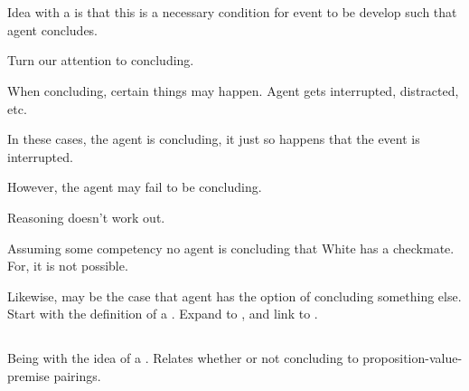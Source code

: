\chapter{}
\label{cha:zS:sec:curbs}

\begin{note}
  Idea with a \curb{} is that this is a necessary condition for event to be develop such that agent concludes.
\end{note}

\begin{note}
  Turn our attention to concluding.

  When concluding, certain things may happen.
  Agent gets interrupted, distracted, etc.

  In these cases, the agent is concluding, it just so happens that the event is interrupted.

  However, the agent may fail to be concluding.

  Reasoning doesn't work out.

  Assuming some competency no agent is concluding that White has a checkmate.
  For, it is not possible.

  Likewise, may be the case that agent has the option of concluding something else.
  Start with the definition of a \bCurb{}.
  Expand to \curb{}, and link  to .
\end{note}

\section{}
\label{sec:bCurb}

\begin{note}
  Being with the idea of a \bCurb{}.
  Relates whether or not concluding to proposition-value-premise pairings.
\end{note}

